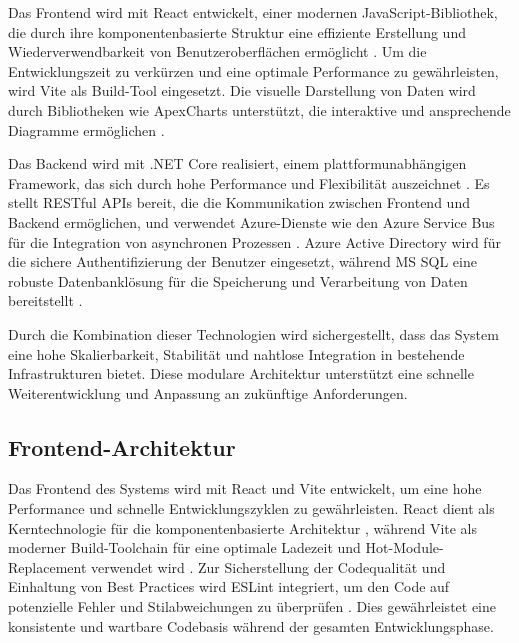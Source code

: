 Das Frontend wird mit React entwickelt, einer modernen JavaScript-Bibliothek, die durch ihre komponentenbasierte Struktur eine effiziente Erstellung und Wiederverwendbarkeit von Benutzeroberflächen ermöglicht \cite{stefanov2021react}. Um die Entwicklungszeit zu verkürzen und eine optimale Performance zu gewährleisten, wird Vite als Build-Tool eingesetzt. Die visuelle Darstellung von Daten wird durch Bibliotheken wie ApexCharts unterstützt, die interaktive und ansprechende Diagramme ermöglichen \cite{apexchartsDoc}.

Das Backend wird mit .NET Core realisiert, einem plattformunabhängigen Framework, das sich durch hohe Performance und Flexibilität auszeichnet \cite{microsoftDotNet}. Es stellt RESTful APIs bereit, die die Kommunikation zwischen Frontend und Backend ermöglichen, und verwendet Azure-Dienste wie den Azure Service Bus für die Integration von asynchronen Prozessen \cite{azureServiceBus}. Azure Active Directory wird für die sichere Authentifizierung der Benutzer eingesetzt, während MS SQL eine robuste Datenbanklösung für die Speicherung und Verarbeitung von Daten bereitstellt \cite{azureDocumentation}.

Durch die Kombination dieser Technologien wird sichergestellt, dass das System eine hohe Skalierbarkeit, Stabilität und nahtlose Integration in bestehende Infrastrukturen bietet. Diese modulare Architektur unterstützt eine schnelle Weiterentwicklung und Anpassung an zukünftige Anforderungen.


\subsection{Frontend-Architektur}
Das Frontend des Systems wird mit React und Vite entwickelt, um eine hohe Performance und schnelle Entwicklungszyklen zu gewährleisten. React dient als Kerntechnologie für die komponentenbasierte Architektur \cite{facebook2021react}, während Vite als moderner Build-Toolchain für eine optimale Ladezeit und Hot-Module-Replacement verwendet wird \cite{vite2022docs}. Zur Sicherstellung der Codequalität und Einhaltung von Best Practices wird ESLint integriert, um den Code auf potenzielle Fehler und Stilabweichungen zu überprüfen \cite{eslint2022guide}. Dies gewährleistet eine konsistente und wartbare Codebasis während der gesamten Entwicklungsphase.


